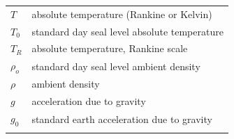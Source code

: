 \documentclass[
]{book}
\begin{document}
\begin{longtable}[]{@{}ll@{}}
\begin{minipage}[t]{0.21\columnwidth}\raggedright
\(T\)\strut
\end{minipage} & \begin{minipage}[t]{0.73\columnwidth}\raggedright
absolute temperature (Rankine or Kelvin)\strut
\end{minipage}\tabularnewline
\begin{minipage}[t]{0.21\columnwidth}\raggedright
\(T_0\)\strut
\end{minipage} & \begin{minipage}[t]{0.73\columnwidth}\raggedright
standard day seal level absolute temperature\strut
\end{minipage}\tabularnewline
\begin{minipage}[t]{0.21\columnwidth}\raggedright
\(T_R\)\strut
\end{minipage} & \begin{minipage}[t]{0.73\columnwidth}\raggedright
absolute temperature, Rankine scale\strut
\end{minipage}\tabularnewline
\begin{minipage}[t]{0.21\columnwidth}\raggedright
\(\rho_ο\)\strut
\end{minipage} & \begin{minipage}[t]{0.73\columnwidth}\raggedright
standard day seal level ambient density\strut
\end{minipage}\tabularnewline
\begin{minipage}[t]{0.21\columnwidth}\raggedright
\(\rho\)\strut
\end{minipage} & \begin{minipage}[t]{0.73\columnwidth}\raggedright
ambient density\strut
\end{minipage}\tabularnewline
\begin{minipage}[t]{0.21\columnwidth}\raggedright
\(g\)\strut
\end{minipage} & \begin{minipage}[t]{0.73\columnwidth}\raggedright
acceleration due to gravity\strut
\end{minipage}\tabularnewline
\begin{minipage}[t]{0.21\columnwidth}\raggedright
\(g_0\)\strut
\end{minipage} & \begin{minipage}[t]{0.73\columnwidth}\raggedright
standard earth acceleration due to gravity\strut
\end{minipage}\tabularnewline
\begin{minipage}[t]{0.21\columnwidth}\raggedright

\end{minipage}
\end{longtable}
\end{document}

